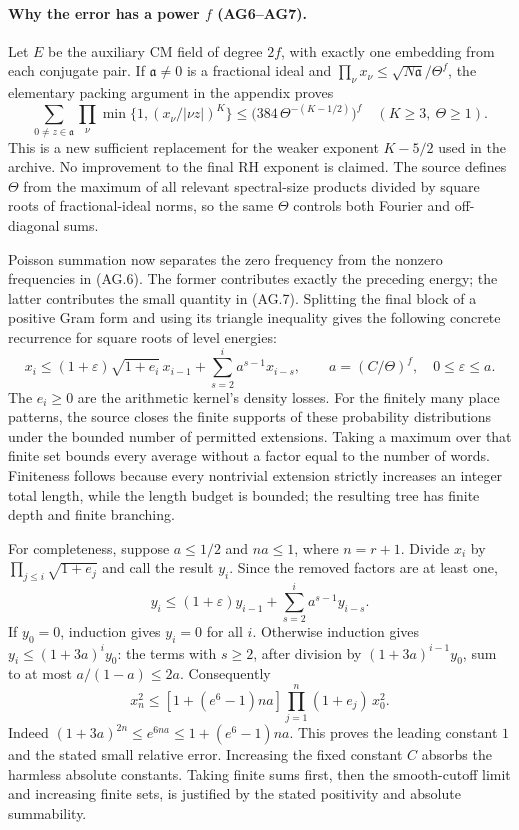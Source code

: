 \documentclass[11pt,a4paper]{article}
\numberwithin{equation}{section}
\theoremstyle{remark}\newtheorem{remark}[theorem]{Remark}
\begin{document}
\paragraph{Why the error has a power \(f\) (AG6--AG7).}
Let \(E\) be the auxiliary CM field of degree \(2f\), with exactly
one embedding from each conjugate pair.  If \(\mathfrak a\ne0\)
is a fractional ideal and
\(\prod_\nu x_\nu\le \sqrt{N\mathfrak a}/\Theta^f\), the elementary
packing argument in the appendix proves
\[
 \sum_{0\ne z\in\mathfrak a}
       \prod_\nu\min\{1,(x_\nu/|\nu z|)^K\}
 \le \bigl(384\,\Theta^{-(K-1/2)}\bigr)^f
 \quad(K\ge3,\ \Theta\ge1).                                  \tag{AG.7}
\]
This is a new sufficient replacement for the weaker exponent
\(K-5/2\) used in the archive.  No improvement to the final RH
exponent is claimed.  The source defines \(\Theta\) from the
maximum of all relevant spectral-size products divided by square
roots of fractional-ideal norms, so the same \(\Theta\) controls
both Fourier and off-diagonal sums.

Poisson summation now separates the zero frequency from the
nonzero frequencies in (AG.6).  The former contributes exactly the
preceding energy; the latter contributes the small quantity in
(AG.7).  Splitting the final block of a positive Gram form and
using its triangle inequality gives the following concrete
recurrence for square roots of level energies:
\[
 x_i\le(1+\varepsilon)\sqrt{1+e_i}\,x_{i-1}
       +\sum_{s=2}^{i}a^{s-1}x_{i-s},\qquad
 a=(C/\Theta)^f,\quad 0\le\varepsilon\le a.                   \tag{AG.8}
\]
The \(e_i\ge0\) are the arithmetic kernel's density losses.
For the finitely many place patterns, the source closes the
finite supports of these probability distributions under the
bounded number of permitted extensions.  Taking a maximum over
that finite set bounds every average without a factor equal to
the number of words.  Finiteness follows because every nontrivial
extension strictly increases an integer total length, while the
length budget is bounded; the resulting tree has finite depth
and finite branching.

For completeness, suppose \(a\le1/2\) and \(na\le1\), where
\(n=r+1\).  Divide \(x_i\) by
\(\prod_{j\le i}\sqrt{1+e_j}\) and call the result \(y_i\).
Since the removed factors are at least one,
\[
 y_i\le(1+\varepsilon)y_{i-1}+
              \sum_{s=2}^{i}a^{s-1}y_{i-s}.
\]
If \(y_0=0\), induction gives \(y_i=0\) for all \(i\).
Otherwise induction gives \(y_i\le(1+3a)^iy_0\): the terms with \(s\ge2\),
after division by \((1+3a)^{i-1}y_0\), sum to at most
\(a/(1-a)\le2a\).  Consequently
\[
 x_n^2\le
 [1+(e^6-1)na]\prod_{j=1}^{n}(1+e_j)\,x_0^2.                \tag{AG.9}
\]
Indeed \((1+3a)^{2n}\le e^{6na}\le1+(e^6-1)na\).
This proves the leading constant \(1\) and the stated small
relative error.  Increasing the fixed constant \(C\) absorbs
the harmless absolute constants.  Taking finite sums first,
then the smooth-cutoff limit and increasing finite sets, is
justified by the stated positivity and absolute summability.
\end{document}
